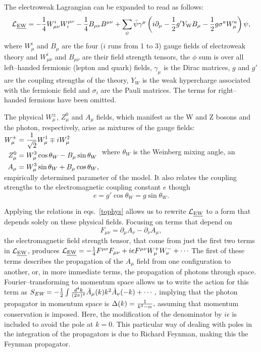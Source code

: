 The electroweak Lagrangian can be expanded to read as follows:
\[\mathcal{L}_\text{\emph{EW}}=-\frac{1}{4}W^i_{\mu\nu}W_i^{\mu\nu}-\frac{1}{4}B_{\mu\nu}B^{\mu\nu}+\sum_\psi\bar\psi\gamma^\mu \left(i\partial_\mu-{1\over2}g^\prime Y_\mathrm{W}B_\mu-{1\over2}g\sigma^a W^a_\mu\right)\psi,\]
where $W^i_{\mu}$ and $B_{\mu}$ are the four ($i$ runs from 1 to 3) gauge fields of electroweak theory and $W^i_{\mu\nu}$ and $B_{\mu\nu}$ are their field strength tensors, the $\phi$ sum is over all left--handed fermionic (lepton and quark) fields, $\gamma_{\mu}$ is the Dirac matrices, $g$ and $g'$ are the coupling strengths of the theory, $Y_W$ is the weak hypercharge associated with the fermionic field and $\sigma_i$ are the Pauli matrices. The terms for right--handed fermions have been omitted.

The physical $W^\pm_\mu$, $Z^0_\mu$ and $A_\mu$ fields, which manifest as the W and Z bosons and the photon, respectively, arise as mixtures of the gauge fields:
\(\begin{aligned}
W_\mu^\pm&=\frac{1}{\sqrt{2}} W^1_\mu\mp iW^2_\mu\\
Z^0_\mu&=W^3_\mu\cos \theta_W-B_\mu\sin \theta_W\\
A_\mu&=W^3_\mu\sin\theta_W+B_\mu\cos\theta_W,
\end{aligned}\label{tophys}\)
where $\theta_W$ is the Weinberg mixing angle, an empirically determined parameter of the model. It also relates the coupling strengths to the electromagnetic coupling constant $e$ though
\[e=g'\cos\theta_W=g\sin\theta_W.\]

Applying the relations in eqs.~\eqref{tophys} allows us to rewrite $\mathcal{L}_{\text{\emph{EW}}}$ to a form that depends solely on these physical fields. Focusing on terms that depend on
\[F_{\mu\nu}=\partial_\mu A_\nu - \partial_\nu A_\mu,\]
the electromagnetic field strength tensor, that come from just the first two terms in $\mathcal{L}_{\text{\emph{EW}}}$, produces
\(\mathcal{L}_{\text{\emph{EW}}}=-\ono4 F^{\mu\nu}F_{\mu\nu}+ie F^{\mu\nu}W^{+}_\mu W^{-}_\nu+\cdots\label{ewfmn}\)
The first of these terms describes the propagation of the $A_\mu$ field from one configuration to another, or, in more immediate terms, the propagation of photons through space. Fourier--transforming to momentum space allows us to write the action for this term as
\(S_{\textit{EW}}=-\frac{1}{2}\int\frac{d^4k}{(2\pi)^4}\tilde A_\mu(k)k^2\tilde A_\nu(-k)+\cdots,\)
implying that the photon propagator in momentum space is
\(\Delta(k)=\frac{1}{k^2-i\epsilon},\label{phoprop}\)
assuming that momentum conservation is imposed. Here, the modification of the denominator by $i\epsilon$ is included to avoid the pole at $k=0$. This particular way of dealing with poles in the integration of the propagators is due to Richard Feynman, making this the Feynman propagator.

